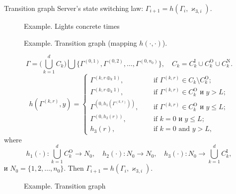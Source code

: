 \documentclass[10pt]{beamer}
\begin{document}
\begin{frame}[allowframebreaks]{Transition graph}
 Server's state switching law: $\Gamma_{i+1}=h(\Gamma_i,\varkappa_{3,i})$.
   \begin{figure}[h]
    \centering
    \caption{Example. Lights concrete times}
    \label{VK:fig:3}
  \end{figure}
   \begin{figure}[h]
    \centering
    \caption{Example. Transition graph (mapping $h(\cdot,\cdot)$).}
    \label{VK:fig:3}
  \end{figure}

  \begin{equation}
  \Gamma = \bigl( \bigcup_{k=1}^d C_k \bigr) \bigcup \{\Gamma^{(0,1)}, \Gamma^{(0,2)}, \ldots, \Gamma^{(0,n_0)}\}, \quad C_k = C_k^{\mathrm{I}} \cup C_k^{\mathrm{O}}  \cup C_k^{\mathrm{N}}.
  \end{equation}
  \begin{equation}
h(\Gamma^{(k,r)},y) = 
\begin{cases}
\Gamma^{(k,r\oplus_k 1)},& \quad \text{ if } \Gamma^{(k,r)}\in C_k\setminus C_k^{\mathrm{O}};\\
\Gamma^{(k,r\oplus_k 1)},& \quad \text{ if } \Gamma^{(k,r)}\in C_k^{\mathrm{O}} \text{ и } y>L;\\
\Gamma^{(0,h_1(\Gamma^{(k,r)}))},& \quad \text{ if } \Gamma^{(k,r)}\in C_k^{\mathrm{O}} \text{ и } y\leqslant L;\\
\Gamma^{(0,h_2(r))},& \quad \text{ if } k=0 \text{ и } y\leqslant L;\\
h_3(r),& \quad \text{ if } k=0 \text{ and } y > L,
\end{cases}
\end{equation}
where 
$$h_1(\cdot)\colon \bigcup_{k=1}^d C_k^{\mathrm{O}}\to N_0, \quad h_2(\cdot)\colon N_0\to N_0, \quad h_3(\cdot)\colon N_0 \to\bigcup_{k=1}^d C_k^{\mathrm{I}},$$ и $N_0=\{1,2, \ldots, n_0\}$.
Then 
$\Gamma_{i+1} = h(\Gamma_i, \varkappa_{3,i}).
$
\end{frame}



   \begin{figure}[h]
    \centering
    \caption{Example. Transition graph}
    \label{VK:fig:4}
  \end{figure}
\end{document}
